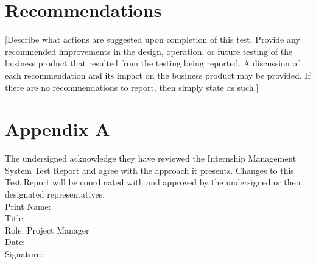 \documentclass{l3deliverable}
\begin{document}
\section{Recommendations}
[Describe what actions are suggested upon completion of this test. Provide any recommended improvements in the design, operation, or future testing of the business product that resulted from the testing being reported.  A discussion of each recommendation and its impact on the business product may be provided.  If there are no recommendations to report, then simply state as such.]
\newpage
\section{Appendix A}
The undersigned acknowledge they have reviewed the Internship Management System Test Report and agree with the approach it presents. Changes to this Test Report will be coordinated with and approved by the undersigned or their designated representatives.\\
Print Name: \\
Title: \\
Role: Project Manager \\
Date: \\
Signature: \\
\end{document}
